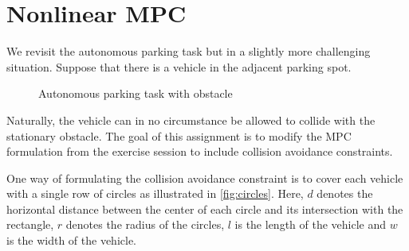 \documentclass[]{article}
\begin{document}
\newpage
\section{Nonlinear MPC}

We revisit the autonomous parking task but in a slightly more challenging situation. 
Suppose that there is a vehicle in the adjacent parking spot. 

\begin{figure}[ht!]
    \centering 
    \caption{Autonomous parking task with obstacle}
    \label{fig:task}
\end{figure}

Naturally, the vehicle can in no circumstance be allowed to collide with the stationary obstacle. 
The goal of this assignment is to modify the MPC formulation from the exercise session to include collision avoidance constraints. 

One way of formulating the collision avoidance constraint is to cover each vehicle with a single row of circles as illustrated in  
\cref{fig:circles}. 
Here, $d$ denotes the horizontal distance between the center of each 
circle and its intersection with the rectangle, $r$ denotes the 
radius of the circles, $l$ is the length of the vehicle and $w$ is the width of the vehicle.
\end{document}
